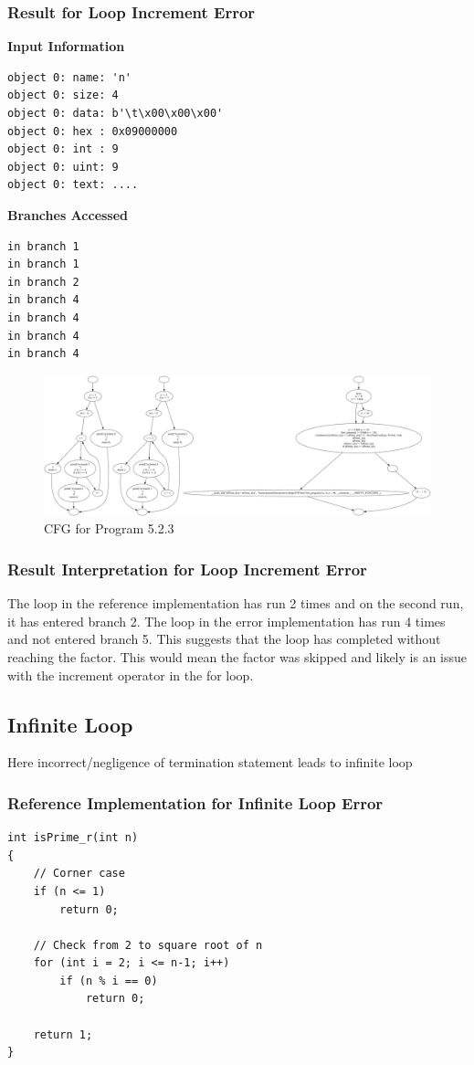 \subsubsection{Result for Loop Increment Error}
\textbf{Input Information}
\begin{verbatim}
object 0: name: 'n'
object 0: size: 4
object 0: data: b'\t\x00\x00\x00'
object 0: hex : 0x09000000
object 0: int : 9
object 0: uint: 9
object 0: text: ....
\end{verbatim}
\textbf{Branches Accessed}
\begin{verbatim}
in branch 1
in branch 1
in branch 2
in branch 4
in branch 4
in branch 4
in branch 4
\end{verbatim}
\begin{figure}[h]
\centering
\includegraphics[width=1\textwidth]{5/5.2.3.c.png}
\caption{CFG for Program 5.2.3}
\label{fig:cfg5.2.3}
\end{figure}
\subsubsection{Result Interpretation for Loop Increment Error}
The loop in the reference implementation has run 2 times and on the second run, it has entered branch 2.
The loop in the error implementation has run 4 times and not entered branch 5. This suggests that the loop has completed without reaching the factor. This would mean the factor was skipped and likely is an issue with the increment operator in the for loop.

\subsection{Infinite Loop}
Here incorrect/negligence of termination statement leads to infinite loop
\subsubsection{Reference Implementation for Infinite Loop Error}
\begin{verbatim}
int isPrime_r(int n)
{
    // Corner case
    if (n <= 1)
        return 0;

    // Check from 2 to square root of n
    for (int i = 2; i <= n-1; i++)
        if (n % i == 0)
            return 0;

    return 1;
}
\end{verbatim}
